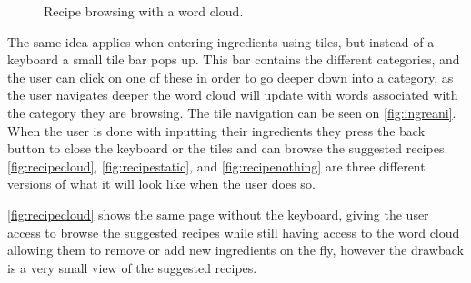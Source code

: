 \begin{figure}[H]
\begin{minipage}[b]{0.5\columnwidth}
\caption{Recipe browsing with a word cloud\label{fig:recipecloud}.}
\end{minipage}
\end{figure}

The same idea applies when entering ingredients using tiles, but instead of a keyboard a small tile bar pops up. This bar contains the different categories, and the user can click on one of these in order to go deeper down into a category, as the user navigates deeper the word cloud will update with words associated with the category they are browsing. The tile navigation can be seen on \autoref{fig:ingreani}. When the user is done with inputting their ingredients they press the back button to close the keyboard or the tiles and can browse the suggested recipes. \autoref{fig:recipecloud}, \autoref{fig:recipestatic}, and \autoref{fig:recipenothing} are three different versions of what it will look like when the user does so.

\autoref{fig:recipecloud} shows the same page without the keyboard, giving the user access to browse the suggested recipes while still having access to the word cloud allowing them to remove or add new ingredients on the fly, however the drawback is a very small view of the suggested recipes. 

